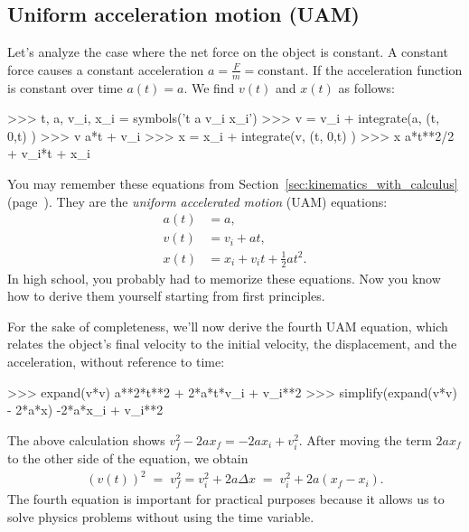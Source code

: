 \subsection{Uniform acceleration motion (UAM)}
\label{mechanics:UAM}

Let's analyze the case where the net force on the object is constant.
A constant force causes a constant acceleration $a = \frac{F}{m} = \textrm{constant}$.
If the acceleration function is constant over time $a(t)=a$.
We find $v(t)$ and $x(t)$ as follows:
\small
\begin{verbatimtab}
>>> t, a, v_i, x_i = symbols('t a v_i x_i')
>>> v = v_i + integrate(a, (t, 0,t) )
>>> v
a*t + v_i
>>> x = x_i + integrate(v, (t, 0,t) )
>>> x
a*t**2/2 + v_i*t + x_i
\end{verbatimtab}
\normalsize

\noindent
You may remember these equations from 
{Section~\ref{sec:kinematics_with_calculus} (page~\pageref{sec:kinematics_with_calculus}).}
They are the \emph{uniform accelerated motion} (UAM) equations:							
\begin{align*}
 a(t) &= a,                                  \\ 
 v(t) &= v_i  + at,                          \\[-2mm] 
 x(t) &= x_i + v_it + \frac{1}{2}at^2.
\end{align*}
In high school, you probably had to memorize these equations.
Now you know how to derive them yourself starting from first principles.

For the sake of completeness, we'll now derive the fourth UAM equation,
which relates the object's final velocity to the initial velocity,
the displacement, and the acceleration, without reference to time:
\small
\begin{verbatimtab}
>>> expand(v*v)
a**2*t**2 + 2*a*t*v_i + v_i**2
>>> simplify(expand(v*v) - 2*a*x)
-2*a*x_i + v_i**2
\end{verbatimtab}
\normalsize

\noindent
The above calculation shows $v_f^2 - 2ax_f = -2ax_i + v_i^2$.
After moving the term $2ax_f$ to the other side of the equation, we obtain
\begin{align*}
 (v(t))^2 \; = \; v_f^2 =  v_i^2  + 2a\Delta x \; = \;  v_i^2  + 2a(x_f-x_i).
\end{align*}  
The fourth equation is important for practical purposes
because it allows us to solve physics problems without using the time variable.


